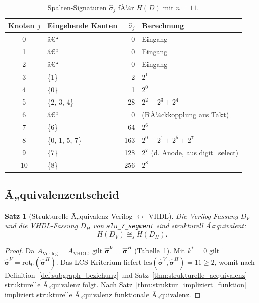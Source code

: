 ﻿\documentclass[12pt,a4paper]{report}
\newtheorem{theorem}{Satz}[section]
\begin{document}
\begin{table}[H]
	\centering
	\begin{tabular}{|c|l|r|l|}
		\hline
		\textbf{Knoten $j$} & \textbf{Eingehende Kanten} & $\hat{\sigma}_j$ & \textbf{Berechnung} \\
		\hline
		0  & â€“                                   &   0 & Eingang \\
		1  & â€“                                   &   0 & Eingang \\
		2  & â€“                                   &   0 & Eingang \\
		3  & \{1\}                               &   2 & $2^1$ \\
		4  & \{0\}                               &   1 & $2^0$ \\
		5  & \{2, 3, 4\}                         &  28 & $2^2 + 2^3 + 2^4$ \\
		6  & â€“                                   &   0 & (RÃ¼ckkopplung aus Takt) \\
		7  & \{6\}                               &  64 & $2^6$ \\
		8  & \{0, 1, 5, 7\}                      & 163 & $2^0+2^1+2^5+2^7$ \\
		9  & \{7\}                               & 128 & $2^7$ (d. Anode, aus digit\_select) \\
		10 & \{8\}                               & 256 & $2^8$ \\
		\hline
	\end{tabular}
	\caption{Spalten-Signaturen $\hat{\sigma}_j$ fÃ¼r $H(D)$ mit $n = 11$.}
	\label{tab:signaturen_vv}
\end{table}

\subsection{Ã„quivalenzentscheid}

\begin{theorem}[Strukturelle Ã„quivalenz Verilog $\leftrightarrow$ VHDL]
	\label{thm:vv_strukturell}
	Die Verilog-Fassung $D_V$ und die VHDL-Fassung $D_H$ von
	\texttt{alu\_7\_segment} sind strukturell Ã¤quivalent:
	\[
	H(D_V) \cong_s H(D_H).
	\]
\end{theorem}

\begin{proof}
	Da $A_\mathrm{Verilog} = A_\mathrm{VHDL}$, gilt
	$\hat{\boldsymbol{\sigma}}^V = \hat{\boldsymbol{\sigma}}^H$ (Tabelle~\ref{tab:signaturen_vv}).
	Mit $k^* = 0$ gilt
	$\hat{\boldsymbol{\sigma}}^V = \mathrm{rot}_0(\hat{\boldsymbol{\sigma}}^H)$.
	Das LCS-Kriterium liefert
	$\mathrm{lcs}(\hat{\boldsymbol{\sigma}}^V, \hat{\boldsymbol{\sigma}}^H) = 11 \geq 2$,
	womit nach Definition~\ref{def:subgraph_beziehung} und
	Satz~\ref{thm:strukturelle_aequivalenz} strukturelle Ã„quivalenz folgt.
	Nach Satz~\ref{thm:struktur_impliziert_funktion} impliziert strukturelle
	Ã„quivalenz funktionale Ã„quivalenz.
\end{proof}
\end{document}
